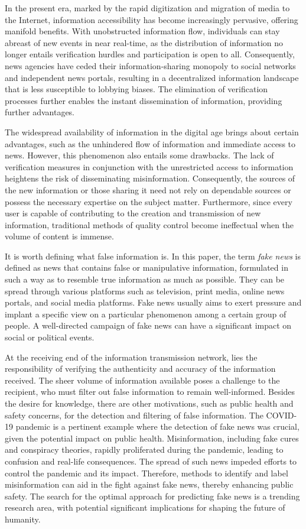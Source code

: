 In the present era, marked by the rapid digitization and migration of media to the Internet, information accessibility has become increasingly pervasive, offering manifold benefits. With unobstructed information flow, individuals can stay abreast of new events in near real-time, as the distribution of information no longer entails verification hurdles and participation is open to all. Consequently, news agencies have ceded their information-sharing monopoly to social networks and independent news portals, resulting in a decentralized information landscape that is less susceptible to lobbying biases. The elimination of verification processes further enables the instant dissemination of information, providing further advantages.

The widespread availability of information in the digital age brings about certain advantages, such as the unhindered flow of information and immediate access to news. However, this phenomenon also entails some drawbacks. The lack of verification measures in conjunction with the unrestricted access to information heightens the risk of disseminating misinformation. Consequently, the sources of the new information or those sharing it need not rely on dependable sources or possess the necessary expertise on the subject matter. Furthermore, since every user is capable of contributing to the creation and transmission of new information, traditional methods of quality control become ineffectual when the volume of content is immense.

It is worth defining what false information is. In this paper, the term \textit{fake news} is defined as news that contains false or manipulative information, formulated in such a way as to resemble true information as much as possible. They can be spread through various platforms such as television, print media, online news portals, and social media platforms. Fake news usually aims to exert pressure and implant a specific view on a particular phenomenon among a certain group of people. A well-directed campaign of fake news can have a significant impact on social or political events.

At the receiving end of the information transmission network, lies the responsibility of verifying the authenticity and accuracy of the information received. The sheer volume of information available poses a challenge to the recipient, who must filter out false information to remain well-informed. Besides the desire for knowledge, there are other motivations, such as public health and safety concerns, for the detection and filtering of false information. The COVID-19 pandemic is a pertinent example where the detection of fake news was crucial, given the potential impact on public health. Misinformation, including fake cures and conspiracy theories, rapidly proliferated during the pandemic, leading to confusion and real-life consequences. The spread of such news impeded efforts to control the pandemic and its impact. Therefore, methods to identify and label misinformation can aid in the fight against fake news, thereby enhancing public safety. The search for the optimal approach for predicting fake news is a trending research area, with potential significant implications for shaping the future of humanity.

